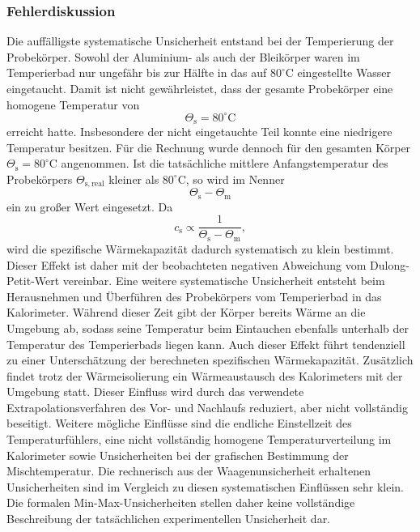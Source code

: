 \documentclass{report}
\begin{document}
\subsubsection{Fehlerdiskussion}
\noindent
Die auffälligste systematische Unsicherheit entstand bei der Temperierung
der Probekörper. Sowohl der Aluminium- als auch der Bleikörper waren im
Temperierbad nur ungefähr bis zur Hälfte in das auf
$80^\circ\mathrm{C}$ eingestellte Wasser eingetaucht.
\noindent
Damit ist nicht gewährleistet, dass der gesamte Probekörper eine homogene
Temperatur von
\[
\Theta_\mathrm{s}=80^\circ\mathrm{C}
\]
\noindent
erreicht hatte. Insbesondere der nicht eingetauchte Teil konnte eine
niedrigere Temperatur besitzen. Für die Rechnung wurde dennoch für den
gesamten Körper $\Theta_\mathrm{s}=80^\circ\mathrm{C}$ angenommen.
\noindent
Ist die tatsächliche mittlere Anfangstemperatur des Probekörpers
$\Theta_\mathrm{s,real}$ kleiner als $80^\circ\mathrm{C}$, so wird im
Nenner
\[
\Theta_\mathrm{s}-\Theta_\mathrm{m}
\]
\noindent
ein zu großer Wert eingesetzt. Da
\[
c_\mathrm{s}
\propto
\frac{1}{\Theta_\mathrm{s}-\Theta_\mathrm{m}},
\]
\noindent
wird die spezifische Wärmekapazität dadurch systematisch zu klein
bestimmt. Dieser Effekt ist daher mit der beobachteten negativen
Abweichung vom Dulong-Petit-Wert vereinbar.
\noindent
Eine weitere systematische Unsicherheit entsteht beim Herausnehmen und
Überführen des Probekörpers vom Temperierbad in das Kalorimeter. Während
dieser Zeit gibt der Körper bereits Wärme an die Umgebung ab, sodass seine
Temperatur beim Eintauchen ebenfalls unterhalb der Temperatur des
Temperierbads liegen kann. Auch dieser Effekt führt tendenziell zu einer
Unterschätzung der berechneten spezifischen Wärmekapazität.
\noindent
Zusätzlich findet trotz der Wärmeisolierung ein Wärmeaustausch des
Kalorimeters mit der Umgebung statt. Dieser Einfluss wird durch das
verwendete Extrapolationsverfahren des Vor- und Nachlaufs reduziert, aber
nicht vollständig beseitigt.
\noindent
Weitere mögliche Einflüsse sind die endliche Einstellzeit des
Temperaturfühlers, eine nicht vollständig homogene Temperaturverteilung im
Kalorimeter sowie Unsicherheiten bei der grafischen Bestimmung der
Mischtemperatur.
\noindent
Die rechnerisch aus der Waagenunsicherheit erhaltenen Unsicherheiten sind
im Vergleich zu diesen systematischen Einflüssen sehr klein. Die formalen
Min-Max-Unsicherheiten stellen daher keine vollständige Beschreibung der
tatsächlichen experimentellen Unsicherheit dar.
\end{document}
